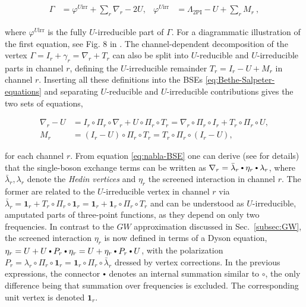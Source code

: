 \documentclass{SciPost}
\newcommand{\fcirc}{\mathbin{\vcenter{\hbox{\scalebox{0.65}{$\bullet$}}}}}
\newcommand{\boldI}{\mathbf{1}}
\begin{document}
%
\begin{linenomath}
    \begin{align}
    \Gamma &= \varphi^{U\text{irr}}+{\textstyle \sum_r} \nabla_r-2U, &
    	\varphi^{U\text{irr}} &= \Lambda_{\text{2PI}} - U + {\textstyle \sum_r} M_r \ , 
    \end{align}
\end{linenomath}
%
where $\varphi^{U\text{irr}}$ is the fully $U$-irreducible part of $\Gamma$. For a diagrammatic illustration of the first equation, see Fig. 8 in \cite{gievers_multiloop_2022}. The channel-dependent decomposition of the vertex $\Gamma = I_r + \gamma_r = \nabla_r + T_r$ can also be split into $U$-reducible and $U$-irreducible parts in channel $r$, defining the $U$-irreducible remainder $T_r= I_r - U + M_r$ in channel $r$. Inserting all these definitions into the BSEs \eqref{eq:Bethe-Salpeter-equations} and separating $U$-reducible and $U$-irreducible contributions gives the two sets of equations,
%
\begin{linenomath}
    \begin{align}
    \nabla_r - U  &= 	 I_r\circ\Pi_r \circ \nabla_r + U \circ\Pi_r \circ  T_r = \nabla_r\circ\Pi_r \circ I_r + T_r \circ\Pi_r \circ U,  \label{eq:nabla-BSE}\\
     M_r &= (I_r - U) \circ\Pi_r\circ  T_r = T_r \circ \Pi_r \circ (I_r-U),
    \end{align}
\end{linenomath}
%
for each channel $r$. From equation \eqref{eq:nabla-BSE} one can derive (see \cite{gievers_multiloop_2022} for details) that the single-boson exchange terms can be written as $\nabla_r = \bar{\lambda}_r\fcirc \eta_r \fcirc\lambda_r$, where $ \bar{\lambda}_r, \lambda_r$ denote the \textsl{Hedin vertices} \cite{PhysRev.139.A796} and $\eta_r$ the screened interaction in channel $r$. The former are related to the $U$-irreducible vertex in channel $r$ via $\bar{\lambda}_r = \boldI_r + T_r \circ \Pi_r \circ \boldI_r = \boldI_r + \boldI_r \circ \Pi_r \circ T_r$ and can be understood as $U$-irreducible, amputated parts of three-point functions, as they depend on only two frequencies. In contrast to the $GW$ approximation discussed in Sec.~\ref{subsec:GW}, the screened interaction $\eta_r$ is now defined in terms of a Dyson equation, $\eta_r = U + U \fcirc P_r \fcirc \eta_r = U + \eta_r \fcirc P_r \fcirc U$, with the polarization $P_r = \lambda_r \circ \Pi_r \circ \boldI_r = \boldI_r \circ \Pi_r \circ \bar \lambda_r$ dressed by vertex corrections. In the previous expressions, the connector $\fcirc$ denotes an internal summation similar to $\circ$, the only difference being that summation over frequencies is excluded. The corresponding unit vertex is denoted $\boldI_r$.
\end{document}
